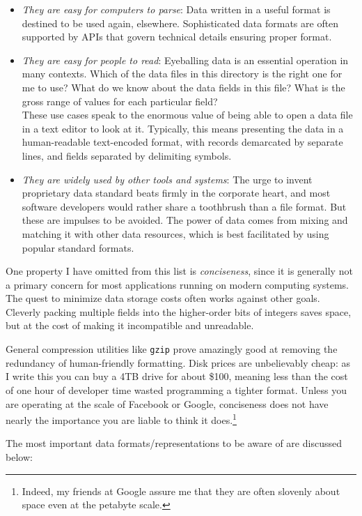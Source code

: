 \documentclass[10pt]{article}
\begin{document}
\begin{itemize}
  \item \textit{They are easy for computers to parse}: Data written in a useful format is destined to be used again, elsewhere. Sophisticated data formats are often supported by APIs that govern technical details ensuring proper format.
  \item \textit{They are easy for people to read}: Eyeballing data is an essential operation in many contexts. Which of the data files in this directory is the right one for me to use? What do we know about the data fields in this file? What is the gross range of values for each particular field?\\
These use cases speak to the enormous value of being able to open a data file in a text editor to look at it. Typically, this means presenting the data in a human-readable text-encoded format, with records demarcated by separate lines, and fields separated by delimiting symbols.
  \item \textit{They are widely used by other tools and systems}: The urge to invent proprietary data standard beats firmly in the corporate heart, and most software developers would rather share a toothbrush than a file format. But these are impulses to be avoided. The power of data comes from mixing and matching it with other data resources, which is best facilitated by using popular standard formats.
\end{itemize}

One property I have omitted from this list is \textit{conciseness}, since it is generally not a primary concern for most applications running on modern computing systems. The quest to minimize data storage costs often works against other goals. Cleverly packing multiple fields into the higher-order bits of integers saves space, but at the cost of making it incompatible and unreadable.

General compression utilities like \texttt{gzip} prove amazingly good at removing the redundancy of human-friendly formatting. Disk prices are unbelievably cheap: as I write this you can buy a 4TB drive for about \$100, meaning less than the cost of one hour of developer time wasted programming a tighter format. Unless you are operating at the scale of Facebook or Google, conciseness does not have nearly the importance you are liable to think it does.\footnote{Indeed, my friends at Google assure me that they are often slovenly about space even at the petabyte scale.}

The most important data formats/representations to be aware of are discussed below:
\end{document}
